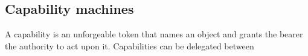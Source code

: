 \subsection{Capability machines}
A capability is an unforgeable token that names an object and grants the bearer the authority to act upon it. Capabilities can be delegated between 
